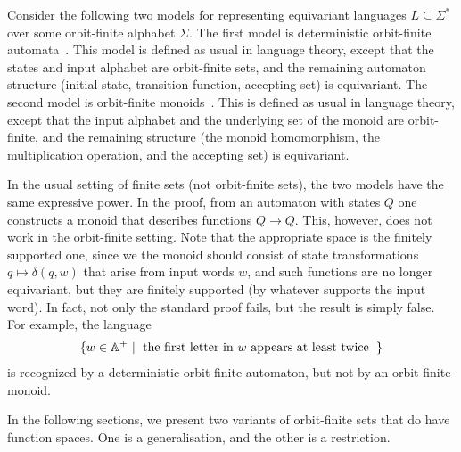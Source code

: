 \begin{example}\label{ex:automata-to-monoids}
    Consider the following two models for representing equivariant languages $L \subseteq \Sigma^*$ over some orbit-finite alphabet $\Sigma$.  The first model is deterministic orbit-finite automata~\cite[Section 3]{bojanczykAutomataTheoryNominal2014}. This model is defined as usual in language theory, except that the states and input alphabet are orbit-finite sets, and the remaining automaton structure (initial state, transition function, accepting set) is equivariant. The second model is orbit-finite monoids~\cite[Section 3]{bojanczykNominalMonoids2013}. This is defined as usual in language theory, except that the input alphabet and  the underlying set of the monoid are orbit-finite, and the remaining structure (the monoid homomorphism, the multiplication operation, and the accepting set) is equivariant.

 
In the usual setting of finite sets (not orbit-finite sets), the two models have the same expressive power. In the proof, from an automaton with states $Q$ one constructs a monoid that describes functions $Q \to Q$. This, however, does not work in the orbit-finite setting. Note that the appropriate space is the finitely supported one, since we the monoid should consist of state transformations $q \mapsto \delta(q,w)$ that arise from input words $w$, and such functions are no longer equivariant, but they are finitely supported (by whatever supports the input word).  In fact, not only the standard proof fails, but the result is simply false.  For example, the language 
\begin{align*}
\setbuild{ w \in \atoms^+}{the first letter in $w$ appears at least twice}
\end{align*}
is recognized by a deterministic orbit-finite automaton, but not by an orbit-finite monoid. 
\end{example}



In the following sections, we present two variants of orbit-finite sets that do have function spaces. One is a generalisation, and the other is a restriction.